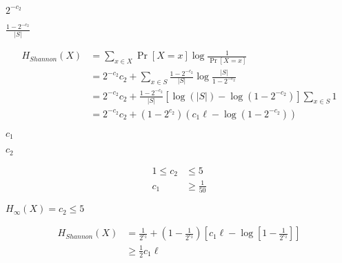 \documentclass[10pt]{book}
\begin{document}
\begin{mdSnippets}
\begin{mdInlineSnippet}[5cd7198821988bf0e239621fd4466fa3]%
$2^{-c_2}$\end{mdInlineSnippet}%
\begin{mdInlineSnippet}%
$\frac{1-2^{-c_2}}{|S|}$\end{mdInlineSnippet}%
\begin{mdDisplaySnippet}[1e9c20ee45cd2691a89c5a350d07b122]%
\[%
\begin{aligned}
H_{Shannon}(X) &= \sum_{x \in X} \Pr[X = x] \log \frac{1}{\Pr[X = x]} \\
&= 2^{-c_2}c_2 + \sum_{x \in S}\frac{1-2^{-c_2}}{|S|} \log \frac{|S|}{1 - 2^{-c_2}} \\
&= 2^{-c_2}c_2 + \frac{1-2^{-c_2}}{|S|} [\log(|S|) - \log (1 - 2^{-c_2})] \sum_{x \in S} 1 \\
&= 2^{-c_2}c_2 + (1-2^{c_2})(c_1\ell - \log(1 - 2^{-c_2}))
\end{aligned}
\]%
\end{mdDisplaySnippet}%
\begin{mdInlineSnippet}%
$c_1$\end{mdInlineSnippet}%
\begin{mdInlineSnippet}[71f0427a673c14326195285a092cc63a]%
$c_2$\end{mdInlineSnippet}%
\begin{mdDisplaySnippet}[bf501b182861bed770b44e4856a46a48]%
\[%
\begin{aligned}
1 \leq c_2 &\leq 5 \\
c_1 &\geq \frac{1}{50}
\end{aligned}
\]%
\end{mdDisplaySnippet}%
\begin{mdInlineSnippet}%
$H_{\infty}(X) = c_2 \leq 5$\end{mdInlineSnippet}%
\begin{mdDisplaySnippet}[9f17e6208479f4395000aa1b3088dff3]%
\[%
\begin{aligned}
H_{Shannon}(X) &= \frac{1}{2^{c_2}} + (1 - \frac{1}{2^{c_2}})[c_1 \ell - \log [1 - \frac{1}{2^{c_2}}]] \\
&\geq \frac{1}{2}c_1 \ell \\

\end{aligned}\]
\end{mdDisplaySnippet}
\end{mdSnippets}
\end{document}
